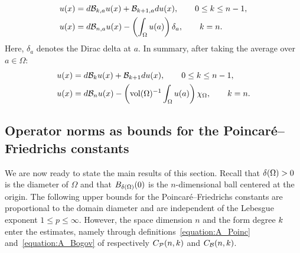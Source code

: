 \documentclass[10pt,a4paper]{article}
\begin{document}
\begin{align*}
    u(x) &= d {\mathcal B}_{k,a} u(x) + {\mathcal B}_{k+1,a} d u(x), \qquad 0 \leq k \leq n-1,
    \\
    u(x) &= d {\mathcal B}_{n,a} u(x) - \left( \int_{\Omega} u(a) \right) \delta_a, \qquad k = n.
\end{align*}
Here, $\delta_a$ denotes the Dirac delta at $a$. 
In summary, after taking the average over $a \in \Omega$:
\begin{align}\label{math:hodgedecomposition:bogov}
    u(x) &= d {\mathcal B}_{k} u(x) + {\mathcal B}_{k+1} d u(x), \qquad 0 \leq k \leq n-1,
    \\
    u(x) &= d {\mathcal B}_{n} u(x) - \left( \operatorname{vol}(\Omega)^{-1} \int_{\Omega} u(a) \right) \chi_{\Omega}, \qquad k = n.
\end{align}


\subsection{Operator norms as bounds for the Poincar\'e--Friedrichs constants}

We are now ready to state the main results of this section. 
Recall that ${\delta}(\Omega) > 0$ is the diameter of $\Omega$ and that $B_{{\delta}(\Omega)}(0)$ is the $n$-dimensional ball centered at the origin.
The following upper bounds for the Poincar\'e--Friedrichs constants are proportional to the domain diameter and are independent of the Lebesgue exponent $1 \leq p \leq \infty$.
However, the space dimension $n$ and the form degree $k$ enter the estimates, 
namely through definitions~\eqref{equation:A_Poinc} and~\eqref{equation:A_Bogov} of respectively $C_{{\mathcal P}}(n,k)$ and $C_{{\mathcal B}}(n,k)$. 
\end{document}
